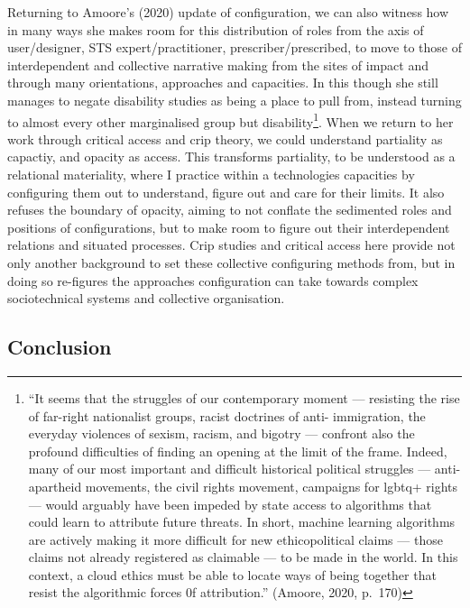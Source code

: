 Returning to Amoore's (2020) update of configuration, we can also
witness how in many ways she makes room for this distribution of roles
from the axis of user/designer, STS expert/practitioner,
prescriber/prescribed, to move to those of interdependent and collective
narrative making from the sites of impact and through many orientations,
approaches and capacities. In this though she still manages to negate
disability studies as being a place to pull from, instead turning to
almost every other marginalised group but disability\footnote{``It seems
  that the struggles of our contemporary moment --- resisting the rise
  of far-right nationalist groups, racist doctrines of anti-
  immigration, the everyday violences of sexism, racism, and bigotry ---
  confront also the profound difficulties of finding an opening at the
  limit of the frame. Indeed, many of our most important and difficult
  historical political struggles --- anti-apartheid movements, the civil
  rights movement, campaigns for lgbtq+ rights --- would arguably have
  been impeded by state access to algorithms that could learn to
  attribute future threats. In short, machine learning algorithms are
  actively making it more difficult for new ethicopolitical claims ---
  those claims not already registered as claimable --- to be made in the
  world. In this context, a cloud ethics must be able to locate ways of
  being together that resist the algorithmic forces 0f attribution.''
  (Amoore, 2020, p.~170)}. When we return to her work through critical
access and crip theory, we could understand partiality as capactiy, and
opacity as access. This transforms partiality, to be understood as a
relational materiality, where I practice within a technologies
capacities by configuring them out to understand, figure out and care
for their limits. It also refuses the boundary of opacity, aiming to not
conflate the sedimented roles and positions of configurations, but to
make room to figure out their interdependent relations and situated
processes. Crip studies and critical access here provide not only
another background to set these collective configuring methods from, but
in doing so re-figures the approaches configuration can take towards
complex sociotechnical systems and collective organisation.

\hypertarget{conclusion}{%
\subsection{Conclusion}\label{conclusion}}

